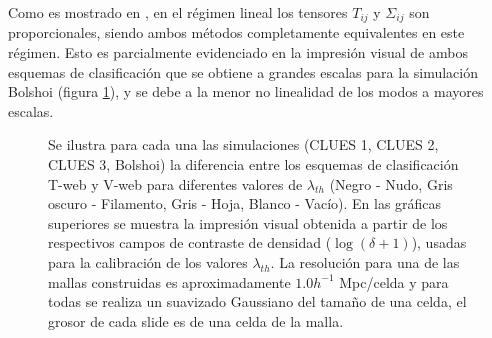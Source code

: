 Como es mostrado en \cite{hoffman2012}, en el régimen lineal los tensores
$T_{ij}$ y $\Sigma_{ij}$ son proporcionales, siendo ambos métodos 
completamente equivalentes en este régimen. Esto es parcialmente 
evidenciado en la impresión visual de ambos esquemas de clasificación que 
se obtiene a grandes escalas para la simulación Bolshoi (figura 
\ref{fig:TwebVwebComparison}), y se debe a la menor no linealidad de los 
modos a mayores escalas. 


\begin{figure}[htbp]
	\begin{center}
	\end{center}

	\caption{\small{Se ilustra para cada una las simulaciones
	(CLUES 1, CLUES 2, CLUES 3, Bolshoi) la diferencia entre los 
	esquemas de clasificación T-web y V-web para diferentes valores de 
	$\lambda_{th}$ (Negro - Nudo, Gris oscuro - Filamento, Gris - Hoja, 
	Blanco - Vacío). En las gráficas superiores se muestra la impresión 
	visual obtenida a partir de los respectivos campos de contraste de 
	densidad ($\log (\delta+1)$), usadas para la calibración de los valores 
	$\lambda_{th}$. La resolución para una de las mallas construidas es 
	aproximadamente $1.0 h^{-1}$ Mpc/celda y para todas se realiza un
	suavizado Gaussiano del tamaño de una celda, el grosor de cada slide
	es de una celda de la malla.}}
	
	\label{fig:TwebVwebComparison}
\end{figure}



